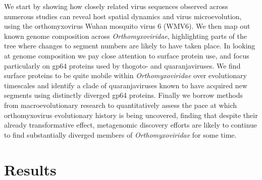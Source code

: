 \documentclass[11pt,twocolumn]{article}
\begin{document}
We start by showing how closely related virus sequences observed across numerous studies can reveal host spatial dynamics and virus microevolution, using the orthomyxovirus Wuhan mosquito virus 6 (WMV6).
We then map out known genome composition across \textit{Orthomyxoviridae}, highlighting parts of the tree where changes to segment numbers are likely to have taken place.
In looking at genome composition we pay close attention to surface protein use, and focus particularly on gp64 proteins used by thogoto- and quaranjaviruses.
We find surface proteins to be quite mobile within \textit{Orthomyxoviridae} over evolutionary timescales and identify a clade of quaranjaviruses known to have acquired new segments using distinctly diverged gp64 proteins.
Finally we borrow methods from macroevolutionary research to quantitatively assess the pace at which orthomyxovirus evolutionary history is being uncovered, finding that despite their already transformative effect, metagenomic discovery efforts are likely to continue to find substantially diverged members of \textit{Orthomyxoviridae} for some time.

\section{Results}
\end{document}
